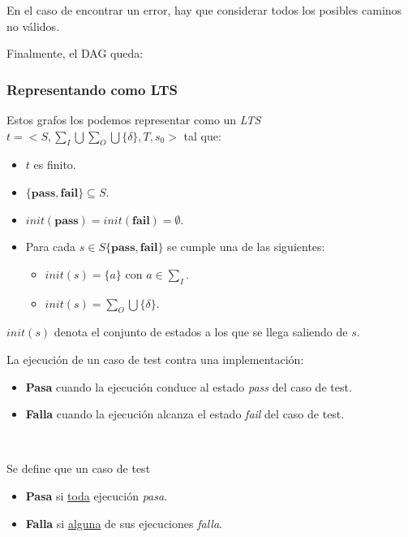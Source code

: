 \documentclass[]{article}
\begin{document}
En el caso de encontrar un error, hay que considerar todos los posibles caminos no válidos.

Finalmente, el DAG queda:


\subsubsection{Representando como LTS}
Estos grafos los podemos representar como un \textit{LTS} $t=<S,\sum_I \bigcup \sum_O \bigcup \{\delta\}, T,s_0>$ tal que:
\begin{itemize}
	\item $t$ es finito.
	\item $\{\mathbf{pass},\mathbf{fail}\}\subseteq S$.
	\item $init(\mathbf{pass}) = init(\mathbf{fail}) = \emptyset$.
	\item Para cada $s\in S \{\mathbf{pass},\mathbf{fail}\}$ se cumple una de las siguientes:
	\begin{itemize}
			\item $init(s)=\{a\}$ con $a\in \sum_I$.
			\item $init(s)=\sum_O \bigcup \{\delta\}$.
	\end{itemize}
\end{itemize}

$init(s)$ denota el conjunto de estados a los que se llega saliendo de $s$.

La ejecución de un caso de test contra una implementación:
\begin{itemize}
	\item \textbf{Pasa} cuando la ejecución conduce al estado \textit{pass} del caso de test.
	\item \textbf{Falla} cuando la ejecución alcanza el estado \textit{fail} del caso de test.
\end{itemize}
~\newline

Se define que un caso de test
\begin{itemize}
	\item \textbf{Pasa} si \underline{toda} ejecución \textit{pasa}.
	\item \textbf{Falla} si \underline{alguna} de sus ejecuciones \textit{falla}.
\end{itemize}

~\newline
\end{document}
